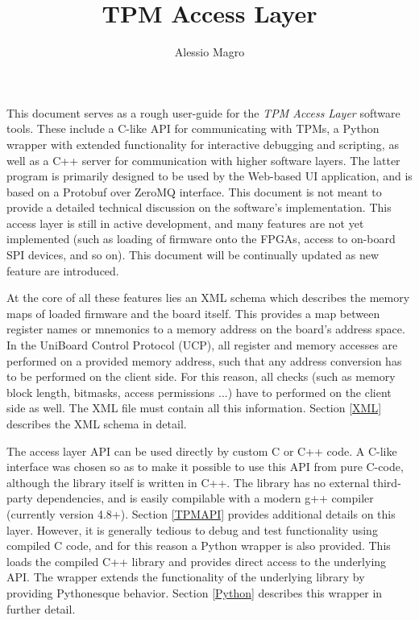 \documentclass[a4paper,11pt]{article}
\title{TPM Access Layer}
\author{Alessio Magro}
\date{}
\begin{document}
\sloppy
\maketitle

This document serves as a rough user-guide for the {\it TPM Access Layer}
software tools. These include a C-like API for communicating with TPMs, a Python 
wrapper with extended functionality for interactive debugging and scripting, as 
well as a C++ server for communication with higher software layers. The latter 
program is primarily designed to be used by the Web-based UI application, and 
is based on a Protobuf over ZeroMQ interface. This document is not meant to 
provide a detailed technical discussion on the software's implementation. This 
access layer is still in active development, and many features are not yet 
implemented (such as loading of firmware onto the FPGAs, access to on-board SPI 
devices, and so on). This document will be continually updated as new feature 
are introduced. 

At the core of all these features lies an XML schema which describes the memory 
maps of loaded firmware and the board itself. This provides a map between 
register names or mnemonics to a memory address on the board's address space. 
In the UniBoard Control Protocol (UCP), all register and memory accesses are 
performed on a provided memory address, such that any address conversion has 
to be performed on the client side. For this reason, all checks (such as 
memory block length, bitmasks, access permissions ...) have to performed on the 
client side as well. The XML file must contain all this information. Section 
\ref{XML} describes the XML schema in detail. 

The access layer API can be used directly by custom C or C++ code. A C-like 
interface was chosen so as to make it possible to use this API from pure 
C-code, although the library itself is written in C++. The library has no 
external third-party dependencies, and is easily compilable with a modern g++ 
compiler (currently version 4.8+). Section \ref{TPMAPI} provides additional 
details on this layer. However, it is generally tedious to debug and test 
functionality using compiled C code, and for this reason a Python wrapper is 
also provided. This loads the compiled C++ library and provides direct access to 
the underlying API. The wrapper extends the functionality of the underlying 
library by providing Pythonesque behavior. Section \ref{Python} describes this 
wrapper in further detail.
\end{document}

